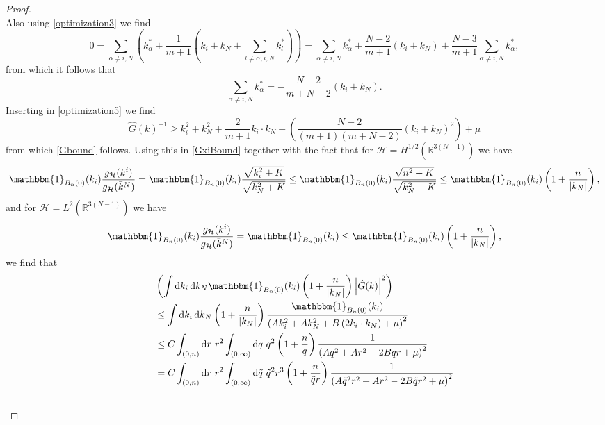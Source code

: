 \documentclass[a4paper,11pt]{article}
\newcommand{\abs}[1]{\left\lvert #1 \right\rvert}
\newcommand*\diff{\mathop{}\!\mathrm{d}}
\newcommand{\R}{\mathbb{R}}
\numberwithin{equation}{section}
\begin{document}
\begin{proof}
\begin{equation}
	\end{equation}
	Also using \eqref{optimization3} we find \begin{equation}
	0=\sum_{\alpha\neq i,N}\left(k^*_\alpha+\frac{1}{m+1}\left(k_i+k_N+\sum_{l\neq\alpha,i,N}k^*_l\right)\right)=\sum_{\alpha\neq i,N}k^*_\alpha+\frac{N-2}{m+1}(k_i+k_N)+\frac{N-3}{m+1}\sum_{\alpha\neq i,N}k^*_\alpha,
	\end{equation}
	from which it follows that \begin{equation}
	\sum_{\alpha\neq i,N}k^*_\alpha=-\frac{N-2}{m+N-2}(k_i+k_N).
	\end{equation}
	Inserting in \eqref{optimization5} we find \begin{equation}
	\hat{G}(k)^{-1}\geq k_i^2+k_N^2+\frac{2}{m+1}k_i\cdot k_N-\left(\frac{N-2}{(m+1)(m+N-2)}\left(k_i+k_N\right)^2\right)+\mu
	\end{equation}
	from which \eqref{Gbound} follows. Using this in \eqref{GxiBound} together with the fact that for $ \mathcal{H}=H^{1/2}(\R^{3(N-1)}) $ we have \begin{equation}
	\mathbbm{1}_{B_n(0)}(k_i)\frac{g_\mathcal{H}(\bar{k}^i)}{g_\mathcal{H}(\bar{k}^N)}=\mathbbm{1}_{B_n(0)}(k_i)\frac{\sqrt{k_i^2+K}}{\sqrt{k_N^2+K}}\leq\mathbbm{1}_{B_n(0)}(k_i)\frac{\sqrt{n^2+K}}{\sqrt{k_N^2+K}}\leq\mathbbm{1}_{B_n(0)}(k_i)\left(1+\frac{n}{\abs{k_N}}\right),
	\end{equation}
	and for $ \mathcal{H}=L^{2}(\R^{3(N-1)}) $ we have \begin{equation}
	\mathbbm{1}_{B_n(0)}(k_i)\frac{g_\mathcal{H}(\bar{k}^i)}{g_\mathcal{H}(\bar{k}^N)}=\mathbbm{1}_{B_n(0)}(k_i)\leq\mathbbm{1}_{B_n(0)}(k_i)\left(1+\frac{n}{\abs{k_N}}\right),
	\end{equation} we find that \begin{equation}
	\begin{aligned}
	&\left(\int\diff k_i \diff k_N \mathbbm{1}_{B_n(0)}(k_i)\left(1+\frac{n}{\abs{k_N}}\right)\abs{\hat{G}(k)}^{2}\right)\\&\leq\int\diff k_i \diff k_N\left(1+\frac{n}{\abs{k_N}}\right) \frac{\mathbbm{1}_{B_n(0)}(k_i)}{\left(Ak_i^2+Ak_N^2+B\left(2k_i\cdot k_N\right)+\mu\right)^{2}}\\&
	\leq C\int_{(0,n)}\diff r\ r^2 \int_{(0,\infty)}\diff q\ q^2\left(1+\frac{n}{q}\right) \frac{1}{\left(Aq^2+Ar^2-2Bqr+\mu\right)^{2}}\\&
	=C\int_{(0,n)}\diff r\ r^2 \int_{(0,\infty)}\diff \tilde{q}\ \tilde{q}^2r^3\left(1+\frac{n}{\tilde{q}r}\right) \frac{1}{\left(A\tilde{q}^2r^2+Ar^2-2B\tilde{q}r^2+\mu\right)^{2}}\\&

\end{aligned}
\end{equation}
\end{proof}
\end{document}

